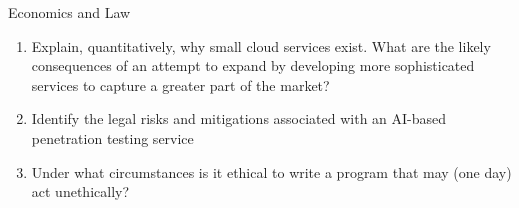 \documentclass{tripos}
\begin{document}
\begin{question}[MockIB,year=2025,paper=2,question=3,author=rrw]{Economics and Law}

  \begin{enumerate}
  \item Explain, quantitatively, why small cloud services exist. What are the likely consequences of an attempt to expand by developing more sophisticated services to capture a greater part of the market? 
  \item Identify the legal risks and mitigations associated with an AI-based penetration testing service 
  \item Under what circumstances is it ethical to write a program that may (one day) act unethically? 
\end{enumerate}

\end{question}
\end{document}
